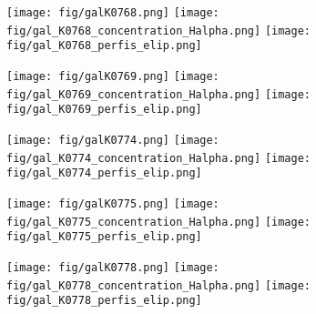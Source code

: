 \begin{figure}[!ht]
\begin{center}
\setcaptionmargin{1cm}
\texttt{[image: fig/galK0768.png]}
\texttt{[image: fig/gal\_K0768\_concentration\_Halpha.png]}
\texttt{[image: fig/gal\_K0768\_perfis\_elip.png]}
\end{center}
\end{figure}


\begin{figure}[!ht]
\begin{center}
\setcaptionmargin{1cm}
\texttt{[image: fig/galK0769.png]}
\texttt{[image: fig/gal\_K0769\_concentration\_Halpha.png]}
\texttt{[image: fig/gal\_K0769\_perfis\_elip.png]}
\end{center}
\end{figure}


\begin{figure}[!ht]
\begin{center}
\setcaptionmargin{1cm}
\texttt{[image: fig/galK0774.png]}
\texttt{[image: fig/gal\_K0774\_concentration\_Halpha.png]}
\texttt{[image: fig/gal\_K0774\_perfis\_elip.png]}
\end{center}
\end{figure}


\begin{figure}[!ht]
\begin{center}
\setcaptionmargin{1cm}
\texttt{[image: fig/galK0775.png]}
\texttt{[image: fig/gal\_K0775\_concentration\_Halpha.png]}
\texttt{[image: fig/gal\_K0775\_perfis\_elip.png]}
\end{center}
\end{figure}


\begin{figure}[!ht]
\begin{center}
\setcaptionmargin{1cm}
\texttt{[image: fig/galK0778.png]}
\texttt{[image: fig/gal\_K0778\_concentration\_Halpha.png]}
\texttt{[image: fig/gal\_K0778\_perfis\_elip.png]}
\end{center}
\end{figure}


